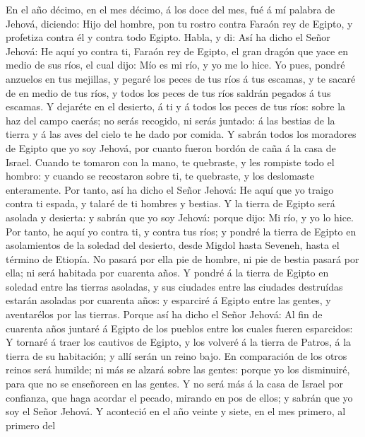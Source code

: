  En el año décimo, en el mes décimo, á los doce del mes,
fué á mí palabra de Jehová, diciendo:  Hijo del hombre,
pon tu rostro contra Faraón rey de Egipto, y profetiza contra él y
contra todo Egipto.  Habla, y di: Así ha dicho el Señor
Jehová: He aquí yo contra ti, Faraón rey de Egipto, el gran dragón que
yace en medio de sus ríos, el cual dijo: Mío es mi río, y yo me lo hice.
 Yo pues, pondré anzuelos en tus mejillas, y pegaré los
peces de tus ríos á tus escamas, y te sacaré de en medio de tus ríos, y
todos los peces de tus ríos saldrán pegados á tus escamas.
 Y dejaréte en el desierto, á ti y á todos los peces de
tus ríos: sobre la haz del campo caerás; no serás recogido, ni serás
juntado: á las bestias de la tierra y á las aves del cielo te he dado
por comida.  Y sabrán todos los moradores de Egipto que yo
soy Jehová, por cuanto fueron bordón de caña á la casa de Israel.
 Cuando te tomaron con la mano, te quebraste, y les
rompiste todo el hombro: y cuando se recostaron sobre ti, te quebraste,
y los deslomaste enteramente.  Por tanto, así ha dicho el
Señor Jehová: He aquí que yo traigo contra ti espada, y talaré de ti
hombres y bestias.  Y la tierra de Egipto será asolada y
desierta: y sabrán que yo soy Jehová: porque dijo: Mi río, y yo lo hice.
 Por tanto, he aquí yo contra ti, y contra tus ríos; y
pondré la tierra de Egipto en asolamientos de la soledad del desierto,
desde Migdol hasta Seveneh, hasta el término de Etiopía. 
No pasará por ella pie de hombre, ni pie de bestia pasará por ella; ni
será habitada por cuarenta años.  Y pondré á la tierra de
Egipto en soledad entre las tierras asoladas, y sus ciudades entre las
ciudades destruídas estarán asoladas por cuarenta años: y esparciré á
Egipto entre las gentes, y aventarélos por las tierras. 
Porque así ha dicho el Señor Jehová: Al fin de cuarenta años juntaré á
Egipto de los pueblos entre los cuales fueren esparcidos:
 Y tornaré á traer los cautivos de Egipto, y los volveré
á la tierra de Patros, á la tierra de su habitación; y allí serán un
reino bajo.  En comparación de los otros reinos será
humilde; ni más se alzará sobre las gentes: porque yo los disminuiré,
para que no se enseñoreen en las gentes.  Y no será más á
la casa de Israel por confianza, que haga acordar el pecado, mirando en
pos de ellos; y sabrán que yo soy el Señor Jehová.  Y
aconteció en el año veinte y siete, en el mes primero, al primero del
